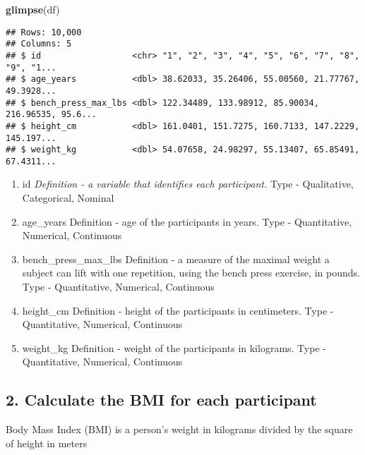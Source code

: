 \documentclass[
]{article}
\newenvironment{Shaded}{\begin{snugshade}}{\end{snugshade}}
\newcommand{\DataTypeTok}[1]{\textcolor[rgb]{0.13,0.29,0.53}{#1}}
\newcommand{\DecValTok}[1]{\textcolor[rgb]{0.00,0.00,0.81}{#1}}
\newcommand{\KeywordTok}[1]{\textcolor[rgb]{0.13,0.29,0.53}{\textbf{#1}}}
\newcommand{\NormalTok}[1]{#1}
\newcommand{\OperatorTok}[1]{\textcolor[rgb]{0.81,0.36,0.00}{\textbf{#1}}}
\newcommand{\StringTok}[1]{\textcolor[rgb]{0.31,0.60,0.02}{#1}}
\providecommand{\tightlist}{%
  \setlength{\itemsep}{0pt}\setlength{\parskip}{0pt}}
\begin{document}
\begin{Shaded}
\begin{Highlighting}[]
\KeywordTok{glimpse}\NormalTok{(df)}
\end{Highlighting}
\end{Shaded}

\begin{verbatim}
## Rows: 10,000
## Columns: 5
## $ id                  <chr> "1", "2", "3", "4", "5", "6", "7", "8", "9", "1...
## $ age_years           <dbl> 38.62033, 35.26406, 55.00560, 21.77767, 49.3928...
## $ bench_press_max_lbs <dbl> 122.34489, 133.98912, 85.90034, 216.96535, 95.6...
## $ height_cm           <dbl> 161.0401, 151.7275, 160.7133, 147.2229, 145.197...
## $ weight_kg           <dbl> 54.07658, 24.98297, 55.13407, 65.85491, 67.4311...
\end{verbatim}

\begin{enumerate}
\def\labelenumi{\arabic{enumi}.}
\tightlist
\item
  id \emph{Definition - a variable that identifies each participant.
  }Type - Qualitative, Categorical, Nominal
\item
  age\_years Definition - age of the participants in years. Type -
  Quantitative, Numerical, Continuous
\item
  bench\_press\_max\_lbs Definition - a measure of the maximal weight a
  subject can lift with one repetition, using the bench press exercise,
  in pounds. Type - Quantitative, Numerical, Continuous
\item
  height\_cm Definition - height of the participants in centimeters.
  Type - Quantitative, Numerical, Continuous
\item
  weight\_kg Definition - weight of the participants in kilograms. Type
  - Quantitative, Numerical, Continuous
\end{enumerate}

\hypertarget{calculate-the-bmi-for-each-participant}{%
\subsection{2. Calculate the BMI for each
participant}\label{calculate-the-bmi-for-each-participant}}

Body Mass Index (BMI) is a person's weight in kilograms divided by the
square of height in meters

\begin{Shaded}
\end{Shaded}
\end{document}
